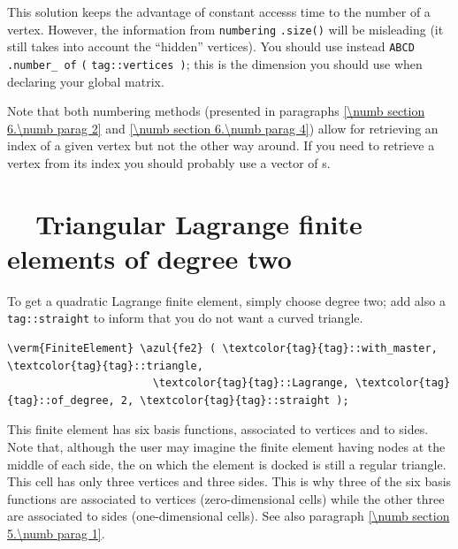 This solution keeps the advantage of constant accesss time to the number of a vertex.
However, the information from {\small\tt numbering} {\small\tt .size()} will be misleading
(it still takes into account the ``hidden'' vertices).
You should use instead {\small\tt ABCD} {\small\tt .number\_\,of} {\small\tt (}
{\small\tt\textcolor{tag}{tag}::vertices )}; this is the dimension you should use
when declaring your global matrix.

Note that both numbering methods (presented in paragraphs \ref{\numb section 6.\numb parag 2}
and \ref{\numb section 6.\numb parag 4}) allow for retrieving
an index of a given vertex but not the other way around.
If you need to retrieve a vertex from its index you should probably use 
a vector of {\small\tt{}}s.


\section{~~Triangular Lagrange finite elements of degree two}\label{\numb section 6.\numb parag 5}

To get a quadratic Lagrange finite element, simply choose degree two; add also a 
{\small\tt\textcolor{tag}{tag}::straight} to inform {\maniFEM} that you do not want
a curved triangle.

\begin{Verbatim}[commandchars=\\\{\},formatcom=\small\tt,frame=single,
   label=parag-\ref{\numb section 6.\numb parag 5}.cpp,rulecolor=\color{coment},
   baselinestretch=0.94,framesep=2mm                                            ]
   \verm{FiniteElement} \azul{fe2} ( \textcolor{tag}{tag}::with_master, \textcolor{tag}{tag}::triangle,
                       \textcolor{tag}{tag}::Lagrange, \textcolor{tag}{tag}::of_degree, 2, \textcolor{tag}{tag}::straight );
\end{Verbatim}

This finite element has six basis functions, associated to vertices and to sides.
Note that, although the user may imagine the finite element having nodes at the middle of
each side, the {\small\tt{}} on which the element is docked is still a regular triangle.
This cell has only three vertices and three sides.
This is why three of the six basis functions are associated to vertices (zero-dimensional cells)
while the other three are associated to sides (one-dimensional cells).
See also paragraph \ref{\numb section 5.\numb parag 1}.

